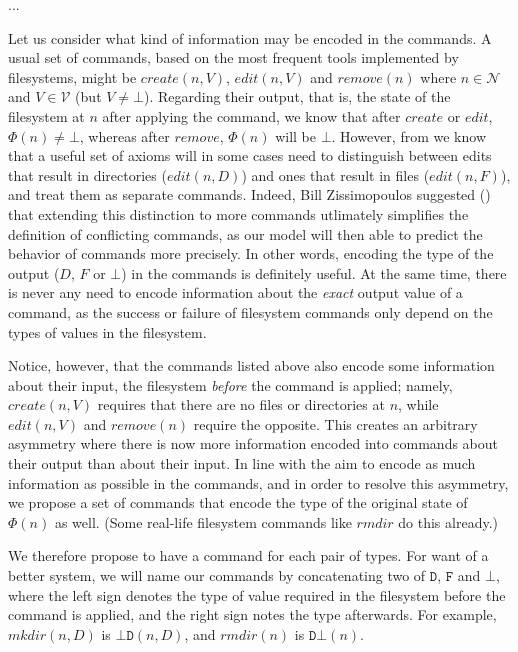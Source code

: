 \documentclass[12pt]{article}
\newcommand{\setv}{\mathcal{V}} %
\newcommand{\setn}{\mathcal{N}} %
\newcommand{\empt}{\bot}
\newcommand{\FS}{\Phi} %
\newcommand{\fscommand}[2]{{#1#2}}
\newcommand{\fsregcommandchar}[1]{\mathtt{#1}}
\newcommand{\fsregcommand}[2]{\fscommand{\fsregcommandchar{#1}}{\fsregcommandchar{#2}}}
\newcommand{\cbd}{\fsregcommand{\empt}{D}}
\newcommand{\cdb}{\fsregcommand{D}{\empt}}
\theoremstyle{definition}
\begin{document}
...

Let us consider what kind of information may be encoded in the commands.
A usual set of commands, based on the most frequent tools implemented by filesystems,
might be $create(n,V)$, $edit(n,V)$ and $remove(n)$ where $n\in\setn$ and $V\in\setv$ (but $V\neq\empt$).
Regarding their output, that is, the state of the filesystem at $n$
after applying the command,
we know that after $create$ or $edit$, $\FS(n)\neq\empt$, whereas after $remove$,
$\FS(n)$ will be $\empt$. 
However, from \cite{NREC:alg} we know that a useful set of axioms
will in some cases need to distinguish between edits that result in directories ($edit(n,D)$) and
ones that result in files ($edit(n,F)$), and treat them as separate commands.
Indeed, Bill Zissimopoulos suggested (\cite{BZ}) that extending this distinction to more commands
utlimately simplifies
the definition of conflicting commands, as our model will then able to predict the behavior of commands
more precisely.
In other words, encoding the type of the output ($D$, $F$ or $\empt$) in the commands is definitely useful.
At the same time, there is never any need to encode information about the
\emph{exact} output value of a command,
as the success or failure of filesystem commands only depend on the types of values in the filesystem.

Notice, however, that the commands listed above also encode some information about 
their input, the filesystem
\emph{before} the command is applied; namely, $create(n,V)$ requires that there are no files
or directories at $n$, while $edit(n,V)$ and $remove(n)$ require the opposite.
This creates an arbitrary asymmetry where
there is now more information encoded into commands about their output than about their input.
In line with the aim to encode as much information as possible in the commands, %
and in order to resolve this asymmetry, we propose a set of commands that encode
the type of the original state of $\FS(n)$ as well.
(Some real-life filesystem commands like $rmdir$ do this already.)

We therefore propose to have a command for each pair of types.
For want of a better system, we will name our commands by concatenating
two of $\fsregcommandchar{D}$, $\fsregcommandchar{F}$ and $\fsregcommandchar{\empt}$, 
where the left sign denotes the type of value
required in the filesystem before the command is applied, and the right sign notes the type
afterwards. For example, $mkdir(n,D)$ is $\cbd(n,D)$, and $rmdir(n)$ is $\cdb(n)$.
\end{document}
